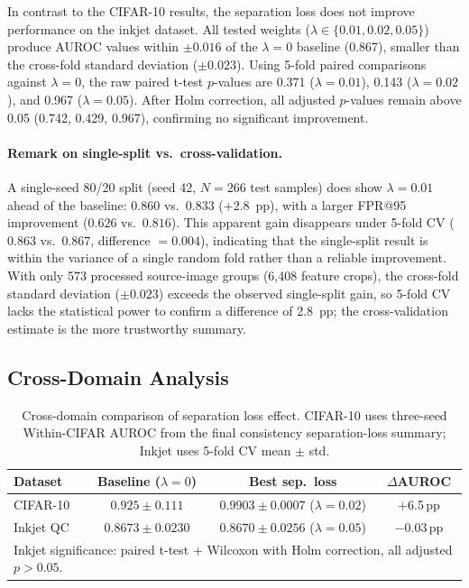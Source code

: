 In contrast to the CIFAR-10 results, the separation loss does not
improve performance on the inkjet dataset.
All tested weights ($\lambda \in \{0.01, 0.02, 0.05\}$) produce AUROC
values within $\pm 0.016$ of the $\lambda = 0$ baseline (0.867), smaller
than the cross-fold standard deviation ($\pm 0.023$).
Using 5-fold paired comparisons against $\lambda = 0$, the raw paired
t-test $p$-values are 0.371 ($\lambda = 0.01$), 0.143
($\lambda = 0.02$), and 0.967 ($\lambda = 0.05$).
After Holm correction, all adjusted $p$-values remain above 0.05
(0.742, 0.429, 0.967), confirming no significant improvement.

\paragraph{Remark on single-split vs.\ cross-validation.}
A single-seed 80/20 split (seed 42, $N = 266$ test samples) does show
$\lambda = 0.01$ ahead of the baseline: $0.860$ vs.\ $0.833$
(+2.8~pp), with a larger FPR@95 improvement ($0.626$ vs.\ $0.816$).
This apparent gain disappears under 5-fold CV ($0.863$ vs.\ $0.867$,
difference $= 0.004$), indicating that the single-split result is
within the variance of a single random fold rather than a reliable
improvement.
With only 573 processed source-image groups (6,408 feature crops), the
cross-fold standard deviation ($\pm 0.023$) exceeds the observed
single-split gain,
so 5-fold CV lacks the statistical power to confirm a difference of
2.8~pp; the cross-validation estimate is the more trustworthy summary.

\subsection{Cross-Domain Analysis}
\label{sec:results:inkjet:cross-domain}

\begin{table}[htbp]
  \centering
  \caption{Cross-domain comparison of separation loss effect. CIFAR-10
    uses three-seed Within-CIFAR AUROC from the final consistency
    separation-loss summary; Inkjet uses 5-fold CV mean $\pm$ std.}
  \label{tab:results:cross-domain}
  \begin{tabular}{lccc}
    \toprule
    Dataset & Baseline ($\lambda = 0$) & Best sep.\ loss
      & $\Delta$AUROC \\
    \midrule
    CIFAR-10   & $0.925 \pm 0.111$
      & $0.9903 \pm 0.0007$ ($\lambda = 0.02$) & +6.5\,pp \\
    Inkjet QC  & $0.8673 \pm 0.0230$
      & $0.8670 \pm 0.0256$ ($\lambda = 0.05$) & $-0.03$\,pp \\
    \bottomrule
    \multicolumn{4}{l}{\footnotesize Inkjet significance: paired t-test
      + Wilcoxon with Holm correction, all adjusted $p > 0.05$.}
  \end{tabular}
\end{table}

